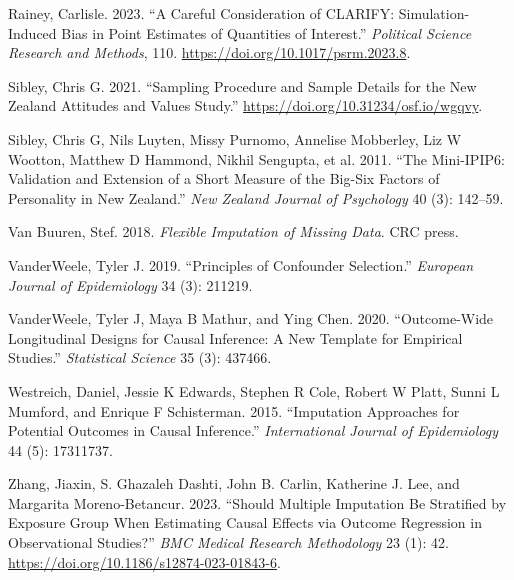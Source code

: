 \documentclass[
  singlecolumn]{report}
\newlength{\cslhangindent}
\newlength{\cslentryspacingunit} %
\newenvironment{CSLReferences}[2] %
 {%
  \setlength{\parindent}{0pt}
  \ifodd #1
  \let\oldpar\par
  \def\par{\hangindent=\cslhangindent\oldpar}
  \fi
  \setlength{\parskip}{#2\cslentryspacingunit}
 }%
 {}
\begin{document}
\begin{CSLReferences}{1}{0}
\leavevmode{}%
Rainey, Carlisle. 2023. {``A Careful Consideration of CLARIFY:
Simulation-Induced Bias in Point Estimates of Quantities of Interest.''}
\emph{Political Science Research and Methods}, 110.
\url{https://doi.org/10.1017/psrm.2023.8}.

\leavevmode{}%
Sibley, Chris G. 2021. {``Sampling Procedure and Sample Details for the
New Zealand Attitudes and Values Study.''}
\url{https://doi.org/10.31234/osf.io/wgqvy}.

\leavevmode{}%
Sibley, Chris G, Nils Luyten, Missy Purnomo, Annelise Mobberley, Liz W
Wootton, Matthew D Hammond, Nikhil Sengupta, et al. 2011. {``The
Mini-IPIP6: Validation and Extension of a Short Measure of the Big-Six
Factors of Personality in New Zealand.''} \emph{New Zealand Journal of
Psychology} 40 (3): 142--59.

\leavevmode{}%
Van Buuren, Stef. 2018. \emph{Flexible Imputation of Missing Data}. CRC
press.

\leavevmode{}%
VanderWeele, Tyler J. 2019. {``Principles of Confounder Selection.''}
\emph{European Journal of Epidemiology} 34 (3): 211219.

\leavevmode{}%
VanderWeele, Tyler J, Maya B Mathur, and Ying Chen. 2020.
{``Outcome-Wide Longitudinal Designs for Causal Inference: A New
Template for Empirical Studies.''} \emph{Statistical Science} 35 (3):
437466.

\leavevmode{}%
Westreich, Daniel, Jessie K Edwards, Stephen R Cole, Robert W Platt,
Sunni L Mumford, and Enrique F Schisterman. 2015. {``Imputation
Approaches for Potential Outcomes in Causal Inference.''}
\emph{International Journal of Epidemiology} 44 (5): 17311737.

\leavevmode{}%
Zhang, Jiaxin, S. Ghazaleh Dashti, John B. Carlin, Katherine J. Lee, and
Margarita Moreno-Betancur. 2023. {``Should Multiple Imputation Be
Stratified by Exposure Group When Estimating Causal Effects via Outcome
Regression in Observational Studies?''} \emph{BMC Medical Research
Methodology} 23 (1): 42.
\url{https://doi.org/10.1186/s12874-023-01843-6}.

\end{CSLReferences}
\end{document}
